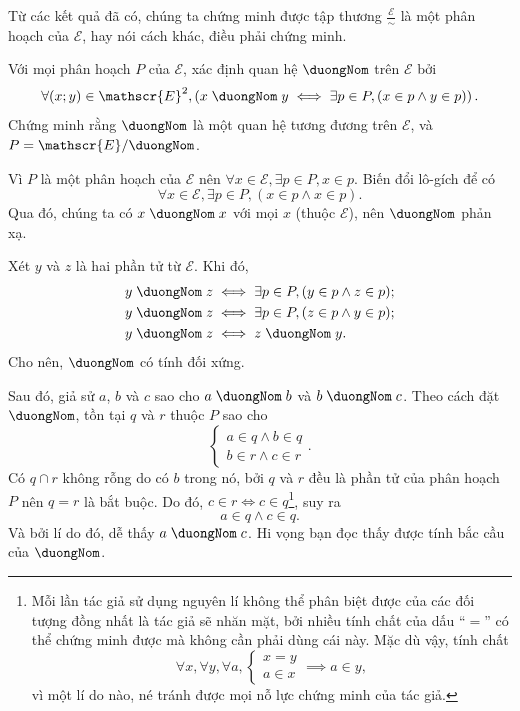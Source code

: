 Từ các kết quả đã có, chúng ta chứng minh được tập thương $\frac{\mathscr{E}}{\sim}$ là một phân hoạch của $\mathscr{E}$, hay nói cách khác, điều phải chứng minh.

\exercise Với mọi phân hoạch $P$ của $\mathscr{E}$, xác định quan hệ $\duongNom$ trên $\mathscr{E}$ bởi
\begin{equation*}
   \forall (x; y) \in \mathscr{E}^2, \left(x\;\duongNom\;y \iff \exists p \in P, (x \in p \land y \in p)\right).
\end{equation*}
Chứng minh rằng $\duongNom$ là một quan hệ tương đương trên $\mathscr{E}$, và $P = \mathscr{E}/\duongNom$.

\solution

Vì $P$ là một phân hoạch của $\mathscr{E}$ nên $\forall x \in \mathscr{E}, \exists p \in P, x \in p$. Biến đổi lô-gích để có \begin{equation*}
   \forall x \in \mathscr{E}, \exists p \in P, (x \in p \land x \in p).
\end{equation*}
Qua đó, chúng ta có $x\;\duongNom\;x$ với mọi $x$ (thuộc $\mathscr{E}$), nên $\duongNom$ phản xạ.

Xét $y$ và $z$ là hai phần tử từ $\mathscr{E}$. Khi đó,
\begin{align*}
   y\;\duongNom\;z &\iff \exists p \in P, (y \in p \land z \in p); \\
   y\;\duongNom\;z &\iff \exists p \in P, (z \in p \land y \in p); \\
   y\;\duongNom\;z &\iff z\;\duongNom\;y. \\
\end{align*}
Cho nên, $\duongNom$ có tính đối xứng.

Sau đó, giả sử $a$, $b$ và $c$ sao cho $a\;\duongNom\;b$ và $b\;\duongNom\;c$. Theo cách đặt $\duongNom$, tồn tại $q$ và $r$ thuộc $P$ sao cho \begin{equation*}
   \begin{cases}
      a \in q \land b \in q \\
      b \in r \land c \in r
   \end{cases}.
\end{equation*}
Có $q \cap r$ không rỗng do có $b$ trong nó, bởi $q$ và $r$ đều là phần tử của phân hoạch $P$ nên $q = r$ là bắt buộc. Do đó, $c \in r \iff c \in q$\footnote{Mỗi lần tác giả sử dụng nguyên lí không thể phân biệt được của các đối tượng đồng nhất là tác giả sẽ nhăn mặt, bởi nhiều tính chất của dấu ``$=$'' có thể chứng minh được mà không cần phải dùng cái này. Mặc dù vậy, tính chất \begin{equation*}
   \forall x, \forall y, \forall a, \begin{cases}
      x = y \\
      a \in x
   \end{cases} \implies a \in y,
\end{equation*} vì một lí do nào, né tránh được mọi nỗ lực chứng minh của tác giả.}, suy ra $$
   a \in q \land c \in q.
$$
Và bởi lí do đó, dễ thấy $a\;\duongNom\;c$. Hi vọng bạn đọc thấy được tính bắc cầu của $\duongNom$.

